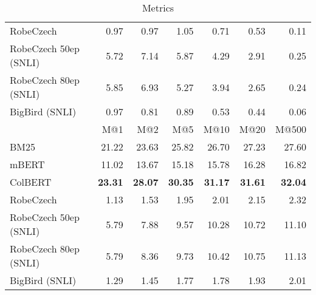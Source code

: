 \begin{table}[!htb]
\begin{tabular}{lrrrrrr}
            RobeCzech &   0.97 &   0.97 &   1.05 &   0.71 &   0.53 &    0.11 \\
RobeCzech 50ep (SNLI) &   5.72 &   7.14 &   5.87 &   4.29 &   2.91 &    0.25 \\
RobeCzech 80ep (SNLI) &   5.85 &   6.93 &   5.27 &   3.94 &   2.65 &    0.24 \\
       BigBird (SNLI) &   0.97 &   0.81 &   0.89 &   0.53 &   0.44 &    0.06 \\
        \midrule
           {}    &  M@1 &  M@2 &  M@5 &  M@10 &  M@20 &  M@500 \\
        \midrule
                          BM25 &  21.22 &  23.63 &  25.82 &   26.70 &   27.23 &    27.60 \\
                         mBERT &  11.02 &  13.67 &  15.18 &   15.78 &   16.28 &    16.82 \\
                       ColBERT &  \bf{23.31} &  \bf{28.07} &  \bf{30.35} &   \bf{31.17} &   \bf{31.61} &    \bf{32.04} \\
                     RobeCzech &   1.13 &   1.53 &   1.95 &    2.01 &    2.15 &     2.32 \\
         RobeCzech 50ep (SNLI) &   5.79 &   7.88 &   9.57 &   10.28 &   10.72 &    11.10 \\
         RobeCzech 80ep (SNLI) &   5.79 &   8.36 &   9.73 &   10.42 &   10.75 &    11.13 \\
                BigBird (SNLI) &   1.29 &   1.45 &   1.77 &    1.78 &    1.93 &     2.01 \\
        \bottomrule
        \end{tabular}
    \caption[\CTK{} Metrics]{\CTK{} Metrics}
\end{table}


